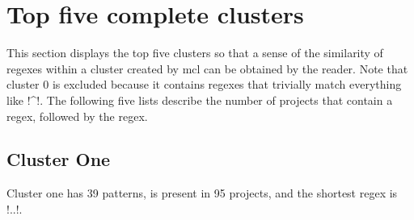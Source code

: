 \section*{Top five complete clusters}
\label{app:top5CompleteClusters}

This section displays the top five clusters so that a sense of the similarity of regexes within a cluster created by mcl can be obtained by the reader.  Note that cluster 0 is excluded because it contains regexes that trivially match everything like \cverb!^!.  The following five lists describe the number of projects that contain a regex, followed by the regex.

\subsection*{Cluster One}
Cluster one has 39 patterns, is present in 95 projects, and the shortest regex is \cverb!..!.
